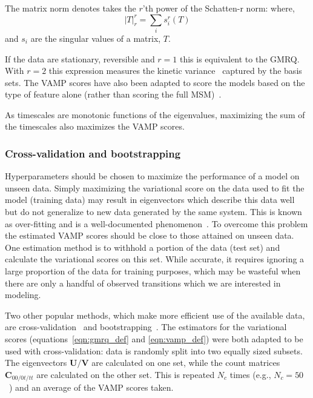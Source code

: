 \documentclass[journal=jacsat,manuscript=article]{achemso}
\begin{document}
The matrix norm denotes takes the $r$'th power of the Schatten-r norm: 
where,
\begin{equation}
    \left | T \right |_{r}^{r} = \sum_{i}s_i^r(T)
\end{equation}
and $s_i$ are the singular values of a matrix, $T$. 

If the data are stationary, reversible and $r=1$ this is equivalent to the GMRQ. With $r=2$ this expression measures the kinetic variance~\cite{noeKineticDistanceKinetic2015} captured by the basis sets. The VAMP scores have also been adapted to score the models based on the type of feature alone (rather than scoring the full MSM)~\cite{scherer_variational_2019}. 

As timescales are monotonic functions of the eigenvalues, maximizing the sum of the timescales also maximizes the VAMP scores. 

\subsubsection{Cross-validation and bootstrapping}

Hyperparameters should be chosen to maximize the performance of a model on unseen data. Simply maximizing the variational score on the data used to fit the model (training data) may result in eigenvectors which describe this data well but do not generalize to new data generated by the same system. This is known as over-fitting and is a well-documented phenomenon~\cite{friedman2001elements}. To overcome this problem the estimated VAMP scores should be close to those attained on unseen data. One estimation method is to withhold a portion of the data (test set) and calculate the variational scores on this set. While accurate, it requires ignoring a large proportion of the data for training purposes, which may be wasteful when there are only a handful of observed transitions which we are interested in modeling. 

Two other popular methods, which make more efficient use of the available data,  are cross-validation~\cite{arlotSurveyCrossvalidationProcedures2009} and bootstrapping~\cite{efronIntroductionBootstrap1993}. The estimators for the variational scores (equations~\ref{eqn:gmrq_def} and \ref{eqn:vamp_def}) were both adapted to be used with cross-validation\cite{wuVariationalApproachLearning2020c, mcgibbonVariationalCrossvalidationSlow2015}: data is randomly split into two equally sized subsets. The eigenvectors $\mathbf{U}/\mathbf{V}$ are calculated on one set, while the count matrices $\mathbf{C}_{00/0t/tt}$ are calculated on the other set.  This is repeated $N_c$ times (e.g., $N_c =50$~\cite{scherer_variational_2019}) and an average of the VAMP scores taken.
\end{document}
